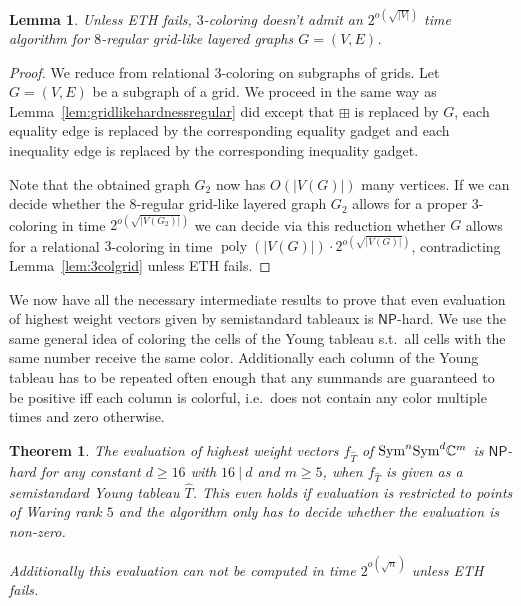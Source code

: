 \documentclass[10pt,a4paper]{article}
\numberwithin{equation}{section}
\newtheorem{theorem}[equation]{Theorem}
\newtheorem{lemma}[equation]{Lemma}
\theoremstyle{definition}
\newcommand{\Sym}{\textup{Sym}}
\newcommand{\IC}{\mathbb{C}}
\newcommand{\NP}{\ensuremath{\mathsf{NP}}}
\DeclareMathOperator{\poly}{poly}
\begin{document}
\begin{lemma}
    \label{lem:gridlikeethhardness}
    Unless ETH fails, $3$-coloring doesn't admit an $2^{o\left(\sqrt{|V|}\right)}$ time algorithm for $8$-regular grid-like layered graphs $G = (V, E)$.
\end{lemma}
\begin{proof}
    We reduce from relational $3$-coloring on subgraphs of grids.
    Let $G = (V, E)$ be a subgraph of a grid.
    We proceed in the same way as Lemma~\ref{lem:gridlikehardnessregular} did except that $\boxplus$ is replaced by $G$, each equality edge is replaced by the corresponding equality gadget and each inequality edge is replaced by the corresponding inequality gadget.
    
    Note that the obtained graph $G_2$ now has $O(|V(G)|)$ many vertices.
    If we can decide whether the $8$-regular grid-like layered graph $G_2$ allows for a proper $3$-coloring in time $2^{o\left(\sqrt{|V(G_2)|}\right)}$ we can decide via this reduction whether $G$ allows for a relational $3$-coloring in time $\poly(|V(G)|) \cdot 2^{o\left(\sqrt{|V(G)|}\right)}$, contradicting Lemma~\ref{lem:3colgrid} unless ETH fails.
\end{proof}

We now have all the necessary intermediate results to prove that even evaluation of highest weight vectors given by semistandard tableaux is $\NP$-hard.
We use the same general idea of coloring the cells of the Young tableau s.t.\ all cells with the same number receive the same color.
Additionally each column of the Young tableau has to be repeated often enough that any summands are guaranteed to be positive iff each column is colorful, i.e.\ does not contain any color multiple times and zero otherwise.


\begin{theorem}
    \label{thm:semistdhardness}
    The evaluation of highest weight vectors $f_{\hat{T}}$ of $\Sym^n\Sym^d \IC^m$ is $\NP$-hard for any constant $d \geq 16$ with $16~|~d$  and $m \geq 5$, when $f_{\hat{T}}$ is given as a semistandard Young tableau $\hat{T}$.
    This even holds if evaluation is restricted to points of Waring rank $5$ and the algorithm only has to decide whether the evaluation is non-zero.

    Additionally this evaluation can not be computed in time $2^{o(\sqrt{n})}$ unless ETH fails.
\end{theorem}
\end{document}

